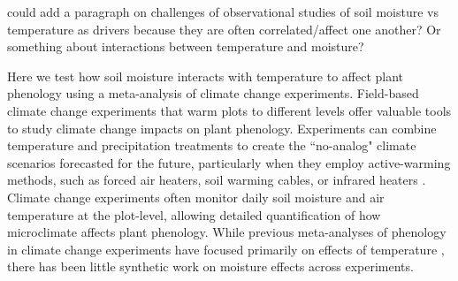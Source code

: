 \documentclass{article}
\begin{document}
\par could add a paragraph on challenges of observational studies of soil moisture vs temperature as drivers because they are often correlated/affect one another? Or something about interactions between temperature and moisture? 
\par Here we test how soil moisture interacts with temperature to affect plant phenology using a meta-analysis of climate change experiments. Field-based climate change experiments that warm plots to different levels offer valuable tools to study climate change impacts on plant phenology. Experiments can combine temperature and precipitation treatments to create the ``no-analog" climate scenarios forecasted for the future, particularly when they employ active-warming methods, such as forced air heaters, soil warming cables, or infrared heaters \citep{shaver2000,williams2007b,aronson2009}. Climate change experiments often monitor daily soil moisture and air temperature at the plot-level, allowing detailed quantification of how microclimate affects plant phenology. While previous meta-analyses of phenology in climate change experiments have focused primarily on effects of temperature \citep[e.g.,][]{wolkovich2012}, there has been little synthetic work on moisture effects across experiments. 
\end{document}
